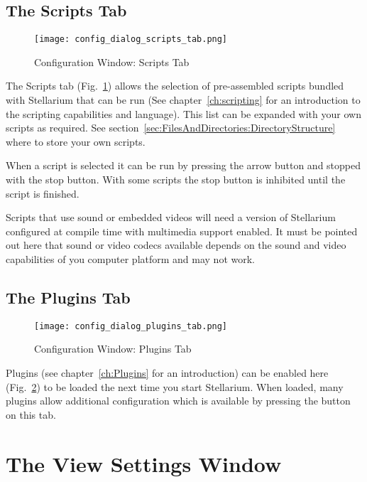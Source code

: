 \subsection{The Scripts Tab}
\label{sec:gui:configuration:scripts}

\begin{figure}[htbp]
\centering\texttt{[image: config\_dialog\_scripts\_tab.png]}
\caption{Configuration Window: Scripts Tab}
\label{fig:gui:configuration:scripts}
\end{figure}

The Scripts tab (Fig.~\ref{fig:gui:configuration:scripts}) allows the
selection of pre-assembled scripts bundled with Stellarium that can be
run (See chapter~\ref{ch:scripting} for an introduction to the
scripting capabilities and language). This list can be expanded with
your own scripts as required. See
section~\ref{sec:FilesAndDirectories:DirectoryStructure} where to
store your own scripts.

When a script is selected it can be run by pressing the arrow button
and stopped with the stop button. With some scripts the stop button is
inhibited until the script is finished. %

Scripts that use sound or embedded videos will need a version of
Stellarium configured at compile time with multimedia support
enabled. It must be pointed out here that sound or video codecs
available depends on the sound and video capabilities of you computer
platform and may not work.


\subsection{The Plugins Tab}
\label{sec:gui:configuration:plugins}

\begin{figure}[htbp]
\centering\texttt{[image: config\_dialog\_plugins\_tab.png]}
\caption{Configuration Window: Plugins Tab}
\label{fig:gui:configuration:plugins}
\end{figure}


Plugins (see chapter~\ref{ch:Plugins} for an introduction) can be
enabled here (Fig.~\ref{fig:gui:configuration:plugins}) to be loaded the next time
you start Stellarium. When loaded, many plugins allow additional configuration
which is available by pressing the  button on this tab.


\section{The View Settings Window}
\label{sec:gui:view}


